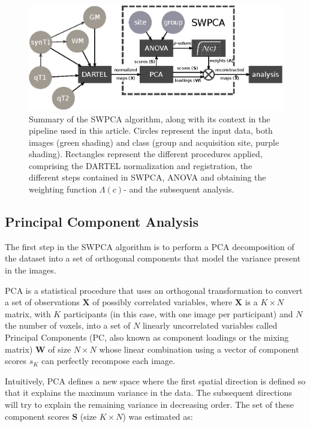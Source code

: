\begin{figure}
\centering
\includegraphics[width=\linewidth]{Graphics/ch7/FIGURE01}
\caption[Summary of the \acs{SWPCA} algorithm, along with its context in the pipeline used in this article.]{Summary of the \ac{SWPCA} algorithm, along with its context in the pipeline used in this article. Circles represent the input data, both images (green shading) and class (group and acquisition site, purple shading). Rectangles represent the different procedures applied, comprising the DARTEL normalization and registration, the different steps contained in \ac{SWPCA}, \ac{ANOVA} and obtaining the weighting function $\Lambda(c)$- and the subsequent analysis.}
\label{fig:swpcaschema}
\end{figure}


\subsection{Principal Component Analysis}\label{sec:pca}
The first step in the \ac{SWPCA} algorithm is to perform a \ac{PCA} decomposition
of the dataset into a set of orthogonal components that model the
variance present in the images. 

\ac{PCA} is a statistical procedure that uses an orthogonal transformation to convert a set of observations $\mathbf{X}$ of possibly correlated variables, where $\mathbf{X}$ is a $K\times N$ matrix, with $K$ participants (in this case, with one image per participant) and $N$ the number of voxels, into a set of $N$ linearly uncorrelated variables called Principal Components (PC, also known as component loadings or the mixing matrix)  $\mathbf{W}$ of size $N\times N$ whose linear combination using a vector of component scores  ${s}_{K}$ can perfectly recompose each image. 

Intuitively, \ac{PCA} defines a new space where the first spatial direction is defined so that it explains the maximum variance in the data. The subsequent directions will try to explain the remaining variance in decreasing order. The set of these component scores  $\mathbf{S}$ (size $K \times N$) was estimated as:

